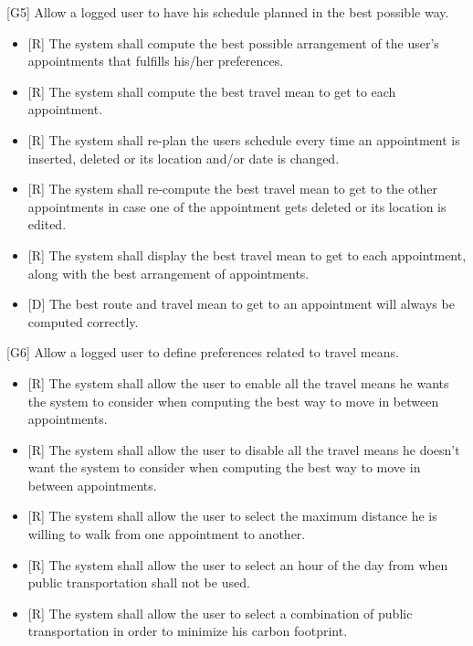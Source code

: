 \documentclass[12pt]{article}
\begin{document}
{[G5]} Allow a logged user to have his schedule planned in the best possible way.
\begin{itemize}
    \item{[R]} The system shall compute the best possible arrangement of the user's appointments that fulfills his/her preferences.
    \item{[R]} The system shall compute the best travel mean to get to each appointment.
    \item{[R]} The system shall re-plan the users schedule every time an appointment is inserted, deleted or its location and/or date is changed.
    \item{[R]} The system shall re-compute the best travel mean to get to the other appointments in case one of the appointment gets deleted or its location is edited.
    \item{[R]} The system shall display the best travel mean to get to each appointment, along with the best arrangement of appointments.
    \item{[D]} The best route and travel mean to get to an appointment will always be computed correctly.
    
\end{itemize}
{[G6]} Allow a logged user to define preferences related to travel means.
\begin{itemize}
    \item{[R]} The system shall allow the user to enable all the travel means he wants the system to consider when computing the best way to move in between appointments.
    \item{[R]} The system shall allow the user to disable all the travel means he doesn't want the system to consider when computing the best way to move in between appointments.
    \item{[R]} The system shall allow the user to select the maximum distance he is willing to walk from one appointment to another.
    \item{[R]} The system shall allow the user to select an hour of the day from when public transportation shall not be used.
    \item{[R]} The system shall allow the user to select a combination of public transportation in order to minimize his carbon footprint.
\end{itemize}
\end{document}

